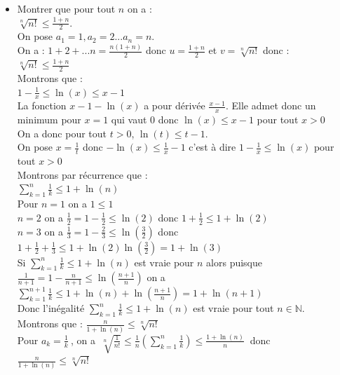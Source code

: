 \documentclass[a4paper,11pt]{book}
\newcommand{\N}{{\mathbb{N}}}
\begin{document}
\begin{itemize}
\item Montrer que pour tout $n$ on a :\\
$\displaystyle  \sqrt[n]{n!}\leq \frac{1+n}{2}$.\\
On pose $a_1=1,a_2=2...a_n=n$.\\
On a : $\displaystyle 1+2+...n=\frac{n(1+n)}{2}$ donc $u=\frac{1+n}{2}$ et $v=\sqrt[n]{n!}$
donc :\\
$\displaystyle \sqrt[n]{n!}\leq \frac{1+n}{2}$\\
Montrons que :\\
$\displaystyle 1-\frac{1}{x}\leq \ln(x)\leq x-1$ \\
La fonction $x-1-\ln(x)$ a pour d\'eriv\'ee $\displaystyle\frac{x-1}{x}$. Elle admet donc 
un minimum pour $x=1$ qui vaut 0 donc $\ln(x)\leq x-1$ pour tout $x>0$\\
On a donc pour tout $t>0$, $\ln(t)\leq t-1$.\\  
On pose $\displaystyle x=\frac{1}{t}$ donc $\displaystyle -\ln(x)\leq\frac{1}{x}-1$ c'est \`a dire
$\displaystyle  1-\frac{1}{x}\leq \ln(x)$ pour tout $x>0$\\
Montrons par r\'ecurrence que :\\
$\displaystyle \sum_{k=1}^n\frac{1}{k}\leq 1+\ln(n)$ \\
Pour $n=1$ on a $1\leq 1$ \\
$n=2$ on a $\displaystyle \frac{1}{2}= 1-\frac{1}{2}\leq \ln(2)$ donc
$\displaystyle 1+\frac{1}{2}\leq 1+\ln(2)$\\
$n=3$ on a $\displaystyle \frac{1}{3}= 1-\frac{2}{3}\leq \ln(\frac{3}{2})$ donc
$\displaystyle 1+\frac{1}{2}+\frac{1}{3}\leq 1+\ln(2)\ln(\frac{3}{2})=1+\ln(3)$\\
Si $\displaystyle \sum_{k=1}^n\frac{1}{k}\leq 1+\ln(n)$ est vraie pour $n$ alors
puisque \\
$\displaystyle \frac{1}{n+1}= 1-\frac{n}{n+1}\leq \ln(\frac{n+1}{n})$ on a \\
$\displaystyle \sum_{k=1}^{n+1}\frac{1}{k}\leq 1+\ln(n)+\ln(\frac{n+1}{n})=1+\ln(n+1)$\\ 
Donc l'in\'egalit\'e $\displaystyle \sum_{k=1}^n\frac{1}{k}\leq 1+\ln(n)$
est vraie pour tout $n\in \N$.\\
Montrons que :
$\displaystyle \frac{n}{1+\ln(n)}\leq \sqrt[n]{n!}$\\
Pour $\displaystyle a_k=\frac{1}{k}\ $, on a  
$\ \displaystyle \sqrt[n]{\frac{1}{n!}}\leq \frac{1}{n}(\sum_{k=1}^n\frac{1}{k})\leq \frac{1+\ln(n)}{n}\ $ donc\\
$\displaystyle \frac{n}{1+\ln(n)}\leq \sqrt[n]{n!}$
\end{itemize}
\end{document}
